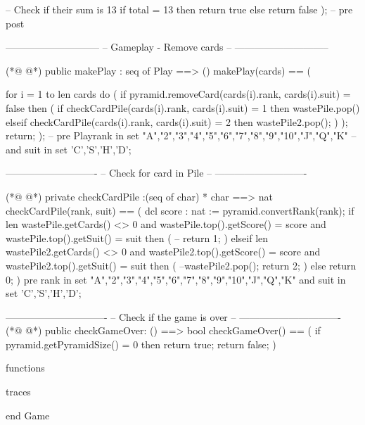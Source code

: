 \begin{vdmpp}[breaklines=true]
   -- Check if their sum is 13
   if total = 13 then return true
   else return false
  );
  -- pre post
  
  -----------------------------
  -- Gameplay - Remove cards --
  -----------------------------
  
(*@
\label{makePlay:224}
@*)
  public makePlay : seq of Play ==> ()
  makePlay(cards) == 
  (
   
   for i = 1 to len cards do
   (
    if pyramid.removeCard(cards(i).rank, cards(i).suit) = false then
    (
     if checkCardPile(cards(i).rank, cards(i).suit) = 1 then 
      wastePile.pop()
     elseif checkCardPile(cards(i).rank, cards(i).suit) = 2 then 
      wastePile2.pop();
    )
   );
   return;
  );
 -- pre Playrank in set {"A","2","3","4","5","6","7","8","9","10","J","Q","K"}
 --  and suit in set {'C','S','H','D'};
  
  ----------------------------
  -- Check for card in Pile --
  ----------------------------  
  
(*@
\label{checkCardPile:247}
@*)
  private checkCardPile :(seq of char) * char ==> nat
  checkCardPile(rank, suit) == 
  (
   dcl score : nat := pyramid.convertRank(rank);
   if len wastePile.getCards() <> 0 and wastePile.top().getScore() = score and wastePile.top().getSuit() = suit then
   (
    --
    return 1;
   )
   elseif len wastePile2.getCards() <> 0 and wastePile2.top().getScore() = score and wastePile2.top().getSuit() = suit then
   (
    --wastePile2.pop();
    return 2;
   )
   else 
   return 0;
   )
   pre rank in set {"A","2","3","4","5","6","7","8","9","10","J","Q","K"}
   and suit in set {'C','S','H','D'};
 
  
  -------------------------------
  -- Check if the game is over --
  -------------------------------
(*@
\label{checkGameOver:271}
@*)
  public checkGameOver: () ==> bool 
  checkGameOver() ==
  (
   if pyramid.getPyramidSize() = 0 then return true;   
   return false;
  )
  
 
 
functions

traces


end Game
\end{vdmpp}
